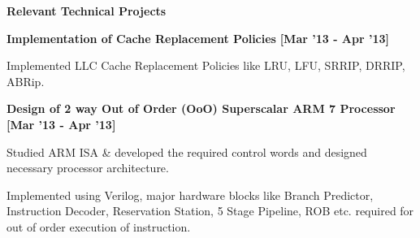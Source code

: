 \documentclass[a4paper,10pt]{article}
\begin{document}
\colorbox{titleColor}{\parbox{6.7in}{\textbf{ Relevant Technical Projects}}}

\begin{itemize*}
  \setlength{\itemsep}{1pt}
  \item \textbf{\small{Implementation of Cache Replacement Policies}} \hfill {\small{{\textbf{[Mar '13 - Apr '13]}}}\/}
  \begin{itemize*}
    \item Implemented LLC Cache Replacement Policies like LRU, LFU, SRRIP, DRRIP, ABRip.
  \end{itemize*}
\end{itemize*}

\begin{itemize*}
  \setlength{\itemsep}{1pt}
  \item \textbf{\small{Design of 2 way Out of Order (OoO) Superscalar ARM 7 Processor}} \hfill {\small{{\textbf{[Mar '13 - Apr '13]}}}\/}
  \begin{itemize*}
    \item Studied ARM ISA \& developed the required control words and designed necessary processor architecture.
    \item Implemented using Verilog, major hardware blocks like Branch Predictor, Instruction Decoder, Reservation Station, 5 Stage Pipeline, ROB etc. required for out of order execution of instruction.
  \end{itemize*}
\end{itemize*}


\end{document}
